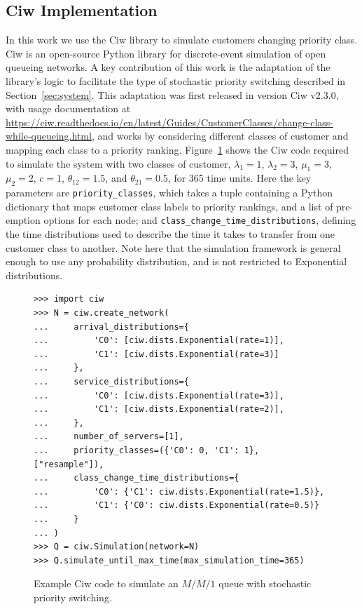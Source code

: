 \documentclass{article}
\begin{document}
\subsection{Ciw Implementation}
In this work we use the Ciw library \cite{palmer19} to simulate customers
changing priority class. Ciw is an open-source Python library for discrete-event
simulation of open queueing networks. A key contribution of this work is the
adaptation of the library's logic to facilitate the type of stochastic priority
switching described in Section~\ref{sec:system}. This adaptation was first
released in version Ciw v2.3.0, with usage documentation at
\url{https://ciw.readthedocs.io/en/latest/Guides/CustomerClasses/change-class-while-queueing.html}, and works by considering different classes
of customer and mapping each class to a priority ranking.
Figure~\ref{fig:ciwcode} shows the Ciw code
required to simulate the system with two classes of customer, $\lambda_1 = 1$,
$\lambda_2 = 3$, $\mu_1 = 3$, $\mu_2 = 2$, $c = 1$, $\theta_{12} =1.5$, and
$\theta_{21} = 0.5$, for 365 time units. Here the key parameters are
\texttt{priority_classes}, which takes a tuple containing a Python
dictionary that maps
customer class labels to priority rankings, and a list of pre-emption options
for each node; and \texttt{class_change_time_distributions},
defining the time distributions used to describe the time it takes to transfer
from one customer class to another. Note here that the simulation framework is
general enough to use any probability distribution, and is not
restricted to Exponential distributions.

\begin{figure}
\begin{verbatim}
>>> import ciw
>>> N = ciw.create_network(
...     arrival_distributions={
...         'C0': [ciw.dists.Exponential(rate=1)],
...         'C1': [ciw.dists.Exponential(rate=3)]
...     },
...     service_distributions={
...         'C0': [ciw.dists.Exponential(rate=3)],
...         'C1': [ciw.dists.Exponential(rate=2)],
...     },
...     number_of_servers=[1],
...     priority_classes=({'C0': 0, 'C1': 1}, ["resample"]),
...     class_change_time_distributions={
...         'C0': {'C1': ciw.dists.Exponential(rate=1.5)},
...         'C1': {'C0': ciw.dists.Exponential(rate=0.5)}
...     }
... )
>>> Q = ciw.Simulation(network=N)
>>> Q.simulate_until_max_time(max_simulation_time=365)
\end{verbatim}
\caption{Example Ciw code to simulate an $M/M/1$ queue with stochastic priority
switching.}
\label{fig:ciwcode}
\end{figure}
\end{document}
